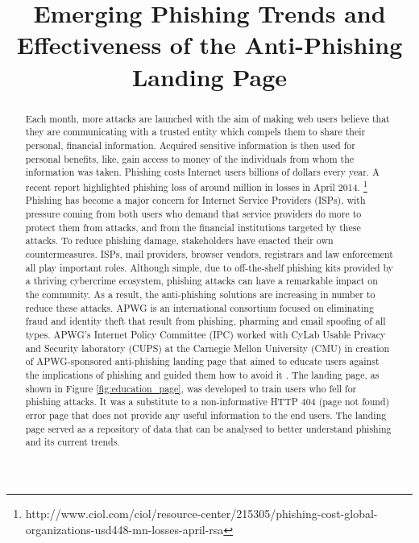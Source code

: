 \documentclass[conference]{IEEEtran}
\begin{document}
\title{Emerging Phishing Trends and Effectiveness of the Anti-Phishing Landing Page}

\author{
}

\maketitle
\begin{abstract}
Each month, more attacks are launched with the aim of making web users believe that they are communicating with a trusted entity which compels them to share their personal, financial information. Acquired sensitive information is then used for personal benefits, like, gain access to money of the individuals from whom the information was taken. Phishing costs Internet users billions of dollars every year. A recent report highlighted phishing loss of around  million in losses in April 2014. \footnote{http://www.ciol.com/ciol/resource-center/215305/phishing-cost-global-organizations-usd448-mn-losses-april-rsa} \newline\indent
Phishing has become a major concern for Internet Service Providers (ISPs), with pressure coming from both users who demand that service providers do more to protect them from attacks, and from the financial institutions targeted by these attacks. To reduce phishing damage, stakeholders have enacted their own countermeasures. ISPs, mail providers, browser vendors, registrars and law enforcement all play important roles. Although simple, due to off-the-shelf phishing kits provided by a thriving cybercrime ecosystem, phishing attacks can have a remarkable impact on the community. As a result, the anti-phishing solutions are increasing in number to reduce these attacks. APWG is an international consortium focused on eliminating fraud and identity theft that result from phishing, pharming and email spoofing of all types. APWG's Internet Policy Committee (IPC) worked with CyLab Usable Privacy and Security laboratory (CUPS) at the Carnegie Mellon University (CMU) in creation of APWG-sponsored anti-phishing landing page that aimed to educate users against the implications of phishing and guided them how to avoid it \cite{pk-404}.
The landing page, as shown in Figure \ref{fig:education_page}, was developed to train users who fell for phishing attacks. It was a substitute to a non-informative HTTP 404 (page not found) error page that does not provide any useful information to the end users. The landing page served as a repository of data that can be analysed to better understand phishing and its current trends.

\end{abstract}
\end{document}
